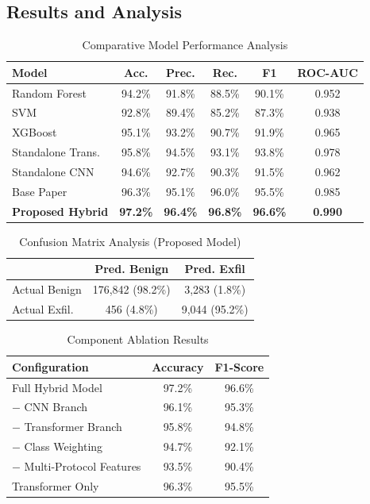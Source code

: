 \documentclass[conference]{IEEEtran}
\renewcommand{\arraystretch}{1.15}
\begin{document}
\subsection{Results and Analysis}

\begin{table}[!t]
\renewcommand{\arraystretch}{1.05}
\caption{Comparative Model Performance Analysis}
\label{table:results}
\centering
\footnotesize
\begin{tabular}{@{}lccccc@{}}
\toprule
\textbf{Model} & \textbf{Acc.} & \textbf{Prec.} & \textbf{Rec.} & \textbf{F1} & \textbf{ROC-AUC} \\
\midrule
Random Forest & 94.2\% & 91.8\% & 88.5\% & 90.1\% & 0.952 \\
SVM & 92.8\% & 89.4\% & 85.2\% & 87.3\% & 0.938 \\
XGBoost & 95.1\% & 93.2\% & 90.7\% & 91.9\% & 0.965 \\
Standalone Trans. & 95.8\% & 94.5\% & 93.1\% & 93.8\% & 0.978 \\
Standalone CNN & 94.6\% & 92.7\% & 90.3\% & 91.5\% & 0.962 \\
Base Paper~\cite{chen2023hybrid} & 96.3\% & 95.1\% & 96.0\% & 95.5\% & 0.985 \\
\textbf{Proposed Hybrid} & \textbf{97.2\%} & \textbf{96.4\%} & \textbf{96.8\%} & \textbf{96.6\%} & \textbf{0.990} \\
\bottomrule
\end{tabular}
\end{table}

\begin{table}[!t]
\renewcommand{\arraystretch}{1.05}
\caption{Confusion Matrix Analysis (Proposed Model)}
\label{table:confusion}
\centering
\footnotesize
\begin{tabular}{@{}lcc@{}}
\toprule
& \textbf{Pred. Benign} & \textbf{Pred. Exfil} \\
\midrule
Actual Benign & 176,842 (98.2\%) & 3,283 (1.8\%) \\
Actual Exfil. & 456 (4.8\%) & 9,044 (95.2\%) \\
\bottomrule
\end{tabular}
\end{table}

\begin{table}[!t]
\renewcommand{\arraystretch}{1.05}
\caption{Component Ablation Results}
\label{table:ablation}
\centering
\footnotesize
\begin{tabular}{@{}lcc@{}}
\toprule
\textbf{Configuration} & \textbf{Accuracy} & \textbf{F1-Score} \\
\midrule
Full Hybrid Model & 97.2\% & 96.6\% \\
$-$ CNN Branch & 96.1\% & 95.3\% \\
$-$ Transformer Branch & 95.8\% & 94.8\% \\
$-$ Class Weighting & 94.7\% & 92.1\% \\
$-$ Multi-Protocol Features & 93.5\% & 90.4\% \\
Transformer Only~\cite{chen2023hybrid} & 96.3\% & 95.5\% \\
\bottomrule
\end{tabular}
\end{table}
\end{document}
